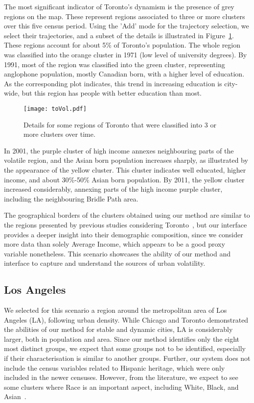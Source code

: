 The most significant indicator of Toronto's dynamism is the presence of grey
regions on the map. These represent regions associated to three or more clusters
over this five census period. Using the 'Add' mode for the trajectory selection,
we select their trajectories, and a subset of the details is illustrated in
Figure~\ref{fig:toVol}. These regions account for about 5\% of Toronto's
population. The whole region was classified into the orange cluster in 1971 (low
level of university degrees). By 1991, most of the region was classified into
the green cluster, representing anglophone population, mostly Canadian born,
with a higher level of education. As the corresponding plot indicates, this
trend in increasing education is city-wide, but this region has people with
better education than most.

\begin{figure}
    \centering 
    \texttt{[image: toVol.pdf]}
    \caption{Details for some regions of Toronto that were classified into 3 or
         more clusters over time.\label{fig:toVol}}
\end{figure}

In 2001, the purple cluster of high income annexes neighbouring parts of the
volatile region, and the Asian born population increases sharply, as illustrated
by the appearance of the yellow cluster.  This cluster indicates well educated,
higher income, and about 30\%-50\% Asian born population. By 2011, the yellow
cluster increased considerably, annexing parts of the high income purple
cluster, including the neighbouring Bridle Path area.

The geographical borders of the clusters obtained using our method are similar
to the regions presented by previous studies considering
Toronto~\citep{hulchanski2007three}, but our interface provides a deeper insight
into their demographic composition, since we consider more data than solely
Average Income, which appears to be a good proxy variable nonetheless. This
scenario showcases the ability of our method and interface to capture and
understand the sources of urban volatility.

\subsection{Los Angeles}

We selected for this scenario a region around the metropolitan area of Los
Angeles (LA), following urban density. While Chicago and Toronto demonstrated
the abilities of our method for stable and dynamic cities, LA is considerably
larger, both in population and area. Since our method identifies only the eight
most distinct groups, we expect that some groups not to be identified,
especially if their characterisation is similar to another groups. Further, our
system does not include the census variables related to Hispanic heritage, which
were only included in the newer censuses. However, from the literature, we
expect to see some clusters where Race is an important aspect, including White,
Black, and Asian~\citep{Reibel2003}.




